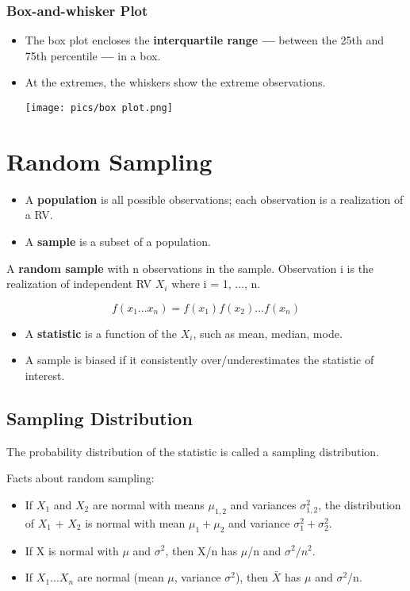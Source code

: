 \documentclass[10pt, letterpaper, twoside]{article}
\newenvironment{Figure}
  {\par\medskip\noindent\minipage{\linewidth}}
  {\endminipage\par\medskip}
\begin{document}
\begin{multicols}{2}
\subsubsection*{Box-and-whisker Plot}
\begin{itemize}
    \item The box plot encloses the \textbf{interquartile range ---} between the 25th and 75th percentile \textbf{---} in a box.
    \item At the extremes, the whiskers show the extreme observations.
    \begin{Figure}
        \centering
        \texttt{[image: pics/box plot.png]}
    \end{Figure}
\end{itemize}

\section{Random Sampling}

\begin{itemize}
    \item A \textbf{population} is all possible observations; each observation is a realization of a RV.
    \item A \textbf{sample} is a subset of a population.
\end{itemize}

A \textbf{random sample} with n observations in the sample. Observation i is the realization of independent RV $X_i$ where i = 1, ..., n.

\begin{equation*}
    f(x_1 ... x_n) = f(x_1)f(x_2)...f(x_n)
\end{equation*}
\begin{itemize}
    \item A \textbf{statistic} is a function of the $X_i$, such as mean, median, mode.
    \item A sample is biased if it consistently over/underestimates the statistic of interest.
\end{itemize}
\subsection{Sampling Distribution}
The probability distribution of the statistic is called a sampling distribution.

Facts about random sampling:
\begin{itemize}
    \item If $X_1$ and $X_2$ are normal with means $\mu_{1,2}$ and variances $\sigma^2_{1,2}$, the distribution of $X_1$ + $X_2$ is normal with mean $\mu_1 + \mu_2$ and variance $\sigma^2_1+ \sigma^2_2$.
    \item If X is normal with $\mu$ and $\sigma^2$, then X/n has $\mu$/n and $\sigma^2/n^2$.
    \item If $X_1...X_n$ are normal (mean $\mu$, variance $\sigma^2$), then $\bar{X}$ has $\mu$ and $\sigma^2$/n.
\end{itemize}


\end{multicols}
\end{document}
